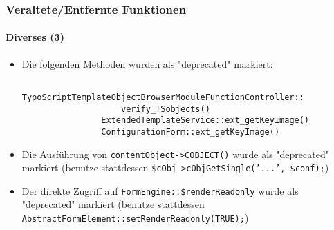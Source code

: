 \begin{frame}[fragile]
	\frametitle{Veraltete/Entfernte Funktionen}
	\framesubtitle{Diverses (3)}

	\begin{itemize}
		\item Die folgenden Methoden wurden als "deprecated" markiert:

			\begin{lstlisting}
				TypoScriptTemplateObjectBrowserModuleFunctionController::
				    verify_TSobjects()
				ExtendedTemplateService::ext_getKeyImage()
				ConfigurationForm::ext_getKeyImage()
			\end{lstlisting}

 		\item Die Ausführung von \texttt{contentObject->COBJECT()} wurde als "deprecated" markiert\newline
 			\smaller(benutze stattdessen \texttt{\$cObj->cObjGetSingle('...', \$conf);})\normalsize

		\item Der direkte Zugriff auf \texttt{FormEngine::\$renderReadonly} wurde als "deprecated" markiert\newline
			\smaller(benutze stattdessen \texttt{AbstractFormElement::setRenderReadonly(TRUE);})\normalsize

	\end{itemize}

\end{frame}


